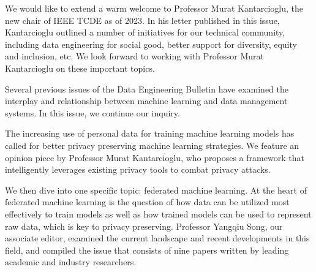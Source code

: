 \documentclass[11pt]{article}
\begin{document}
We would like to extend a warm welcome to Professor Murat
Kantarcioglu, the new chair of IEEE TCDE as of 2023. In his letter
published in this issue, Kantarcioglu outlined a number of initiatives
for our technical community, including data engineering for social
good, better support for diversity, equity and inclusion, etc.  We
look forward to working with Professor Murat Kantarcioglu on these
important topics.

Several previous issues of the Data Engineering Bulletin have examined
the interplay and relationship between machine learning and data
management systems. In this issue, we continue our inquiry.

The increasing use of personal data for training machine learning
models has called for better privacy preserving machine learning
strategies.  We feature an opinion piece by Professor Murat
Kantarcioglu, who proposes a framework that intelligently leverages
existing privacy tools to combat privacy attacks.

We then dive into one specific topic: federated machine learning. At
the heart of federated machine learning is the question of how data
can be utilized most effectively to train models as well as how
trained models can be used to represent raw data, which is key to
privacy preserving.  Professor Yangqiu Song, our associate editor,
examined the current landscape and recent developments in this field,
and compiled the issue that consists of nine papers written by leading
academic and industry researchers.
\end{document}
